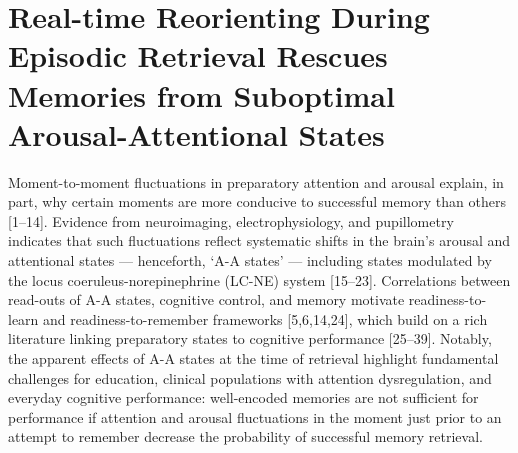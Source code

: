 \chapter{Real-time Reorienting During Episodic Retrieval Rescues Memories from Suboptimal Arousal-Attentional States}

Moment-to-moment fluctuations in preparatory attention and arousal explain, in part, why certain moments are more conducive to successful memory than others [1–14]. Evidence from neuroimaging, electrophysiology, and pupillometry indicates that such fluctuations reflect systematic shifts in the brain’s arousal and attentional states — henceforth, ‘A-A states’ — including states modulated by the locus coeruleus-norepinephrine (LC-NE) system [15–23]. Correlations between read-outs of A-A states, cognitive control, and memory motivate readiness-to-learn and readiness-to-remember frameworks [5,6,14,24], which build on a rich literature linking preparatory states to cognitive performance [25–39]. Notably, the apparent effects of A-A states at the time of retrieval highlight fundamental challenges for education, clinical populations with attention dysregulation, and everyday cognitive performance: well-encoded memories are not sufficient for performance if attention and arousal fluctuations in the moment just prior to an attempt to remember decrease the probability of successful memory retrieval.
